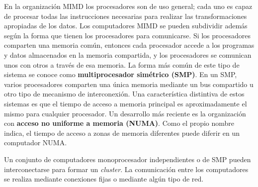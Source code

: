 En la organización MIMD los procesadores son de uso general; cada uno es capaz de procesar todas las instrucciones necesarias para realizar las transformaciones apropiadas de los datos. Los computadores MIMD se pueden subdividir además según la forma que tienen los procesadores para comunicarse. Si los procesadores comparten una memoria común, entonces cada procesador accede a los programas y datos almacenados en la memoria compartida, y los procesadores se comunican unos con otros a través de esa memoria. La forma más común de este tipo de sistema se conoce como \textbf{multiprocesador simétrico (SMP)}. En un SMP, varios procesadores comparten una única memoria mediante un bus compartido u otro tipo de mecanismo de interconexión. Una característica distintiva de estos sistemas es que el tiempo de acceso a memoria principal es aproximadamente el mismo para cualquier procesador. Un desarrollo más reciente es la organización con \textbf{acceso no uniforme a memoria (NUMA)}. Como el propio nombre indica, el tiempo de acceso a zonas de memoria diferentes puede diferir en un computador NUMA.\@

Un conjunto de computadores monoprocesador independientes o de SMP pueden interconectarse para formar un \textit{cluster}. La comunicación entre los computadores se realiza mediante conexiones fijas o mediante algún tipo de red.

